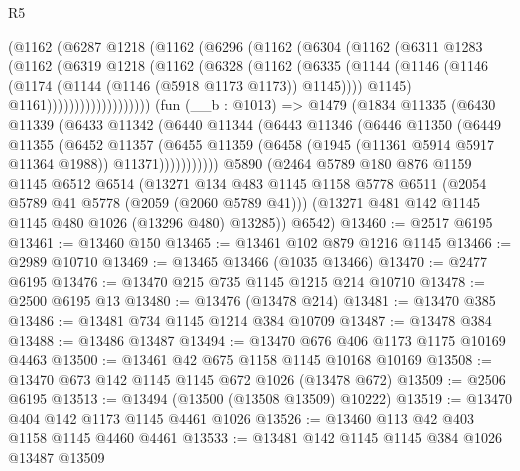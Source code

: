 \begin{lexlean}{R5}
\begin{coremodule}
              (@1162
                (@6287
                  @1218
                  (@1162
                    (@6296
                      (@1162
                        (@6304
                          (@1162
                            (@6311
                              @1283
                              (@1162
                                (@6319
                                  @1218
                                  (@1162
                                    (@6328
                                      (@1162
                                        (@6335
                                          (@1144
                                            (@1146
                                              (@1146
                                                (@1174 (@1144 (@1146 (@5918 @1173 @1173)) @1145))))
                                            @1145)
                                          @1161)))))))))))))))))))
    (fun (__b : @1013) =>
    @1479
      (@1834
        @11335
        (@6430
          @11339
          (@6433
            @11342
            (@6440
              @11344
              (@6443
                @11346
                (@6446
                  @11350
                  (@6449
                    @11355
                    (@6452
                      @11357
                      (@6455
                        @11359
                        (@6458 (@1945 (@11361 @5914 @5917 @11364 @1988)) @11371)))))))))))
    @5890
    (@2464
      @5789
      @180
      @876
      @1159
      @1145
      @6512
      @6514
      (@13271
        @134
        @483
        @1145
        @1158
        @5778
        @6511
        (@2054 @5789 @41 @5778 (@2059 (@2060 @5789 @41)))
        (@13271 @481 @142 @1145 @1145 @480 @1026 (@13296 @480) @13285))
      @6542)
@13460 := @2517 @6195
@13461 := @13460 @150
@13465 := @13461 @102 @879 @1216 @1145
@13466 := @2989 @10710
@13469 := @13465 @13466 (@1035 @13466)
@13470 := @2477 @6195
@13476 := @13470 @215 @735 @1145 @1215 @214 @10710
@13478 := @2500 @6195 @13
@13480 := @13476 (@13478 @214)
@13481 := @13470 @385
@13486 := @13481 @734 @1145 @1214 @384 @10709
@13487 := @13478 @384
@13488 := @13486 @13487
@13494 := @13470 @676 @406 @1173 @1175 @10169 @4463
@13500 := @13461 @42 @675 @1158 @1145 @10168 @10169
@13508 := @13470 @673 @142 @1145 @1145 @672 @1026 (@13478 @672)
@13509 := @2506 @6195
@13513 := @13494 (@13500 (@13508 @13509) @10222)
@13519 := @13470 @404 @142 @1173 @1145 @4461 @1026
@13526 := @13460 @113 @42 @403 @1158 @1145 @4460 @4461
@13533 := @13481 @142 @1145 @1145 @384 @1026 @13487 @13509

\end{coremodule}
\end{lexlean}
